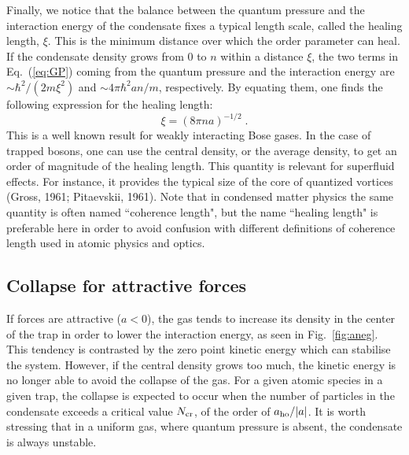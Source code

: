 Finally, we notice that the balance between the quantum pressure and the  
interaction energy of the condensate fixes a typical length scale, 
called the healing length, $\xi$.  This is the minimum distance over 
which the order parameter can heal. If the condensate density grows 
from $0$ to $n$ within a distance $\xi$, the two terms in 
Eq.~(\ref{eq:GP}) coming from the quantum pressure and the interaction 
energy are $\sim \hbar^2/(2m\xi^2)$ and $\sim  4 \pi \hbar^2 a n/m$, 
respectively. By equating them, one finds the following expression 
for the healing length:
\begin{equation}
\xi = (8 \pi n a )^{-1/2} \; .
\label{eq:healinglength}
\end{equation}
This is a well known result for weakly interacting Bose gases. In the 
case of trapped bosons, one can use the central  density, or the average 
density,  to get an order of magnitude  of the healing length. This 
quantity is relevant for  superfluid effects. For instance, it provides
the typical size of the core of quantized vortices (Gross, 1961; 
Pitaevskii, 1961). Note that in condensed matter physics the
same quantity is often named ``coherence length", but the name  
``healing length" is preferable here in order to avoid confusion with 
different definitions of coherence length used in atomic physics and
optics. 


\subsection{Collapse for attractive forces}
\label{sec:attractiveforces}

If forces are attractive ($a<0$), the gas tends to increase
its density in the center of the trap in order to lower the 
interaction energy, as seen in  Fig.~\ref{fig:aneg}. 
This tendency is contrasted by the zero point kinetic energy
which can stabilise the system. However, if the central density
grows too much, the kinetic energy is no longer able to avoid the
collapse of the gas. For a given atomic species in a given trap,
the collapse is expected to occur when the number of particles in 
the condensate exceeds a critical value $N_{\rm cr}$, of the order 
of $a_{\rm ho}/|a|$. It is worth stressing that in a uniform gas, 
where quantum pressure is absent, the condensate is always unstable.

